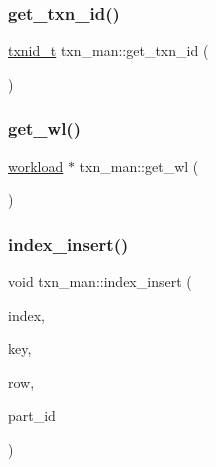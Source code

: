 \mbox{\label{classtxn__man_a26c38d64be1ad53236a0017f8c2ff9ff}} 
\subsubsection{\texorpdfstring{get\+\_\+txn\+\_\+id()}{get\_txn\_id()}}
{\footnotesize\ttfamily \hyperlink{global_8h_a5b3a704dab2aafdcaadfe8c0909716ef}{txnid\+\_\+t} txn\+\_\+man\+::get\+\_\+txn\+\_\+id (\begin{DoxyParamCaption}{ }\end{DoxyParamCaption})}

\mbox{\label{classtxn__man_a0e873c5e1ac5fabe4555d443215ef0c5}} 
\subsubsection{\texorpdfstring{get\+\_\+wl()}{get\_wl()}}
{\footnotesize\ttfamily \hyperlink{classworkload}{workload} $\ast$ txn\+\_\+man\+::get\+\_\+wl (\begin{DoxyParamCaption}{ }\end{DoxyParamCaption})}

\mbox{\label{classtxn__man_ae90afaf5c0ba23e804f6719c41d65499}} 
\subsubsection{\texorpdfstring{index\+\_\+insert()}{index\_insert()}}
{\footnotesize\ttfamily void txn\+\_\+man\+::index\+\_\+insert (\begin{DoxyParamCaption}\item[{\hyperlink{classIndex}{Index} $\ast$}]{index,  }\item[{uint64\+\_\+t}]{key,  }\item[{\hyperlink{classrow__t}{row\+\_\+t} $\ast$}]{row,  }\item[{int64\+\_\+t}]{part\+\_\+id }\end{DoxyParamCaption})}

